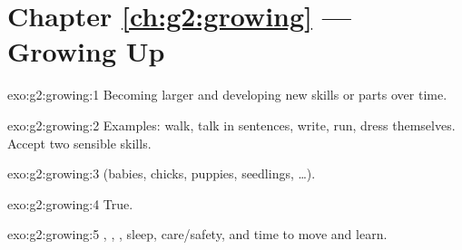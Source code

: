 \section*{Chapter \ref{ch:g2:growing} --- Growing Up}

\begin{solution}{exo:g2:growing:1}
Becoming larger and developing new skills or parts over time.
\end{solution}

\begin{solution}{exo:g2:growing:2}
Examples: walk, talk in sentences, write, run, dress themselves.
Accept two sensible skills.
\end{solution}

\begin{solution}{exo:g2:growing:3}
 (babies, chicks, puppies, seedlings, \dots).
\end{solution}

\begin{solution}{exo:g2:growing:4}
True.
\end{solution}

\begin{solution}{exo:g2:growing:5}
, , , sleep, care/safety, and time to move and learn.
\end{solution}

